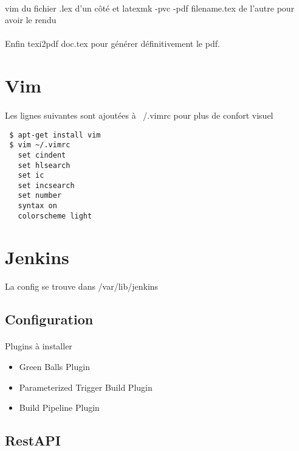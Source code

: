 \documentclass{article}
\begin{document}
\paragraph{}
vim du fichier .lex d'un côté et latexmk -pvc -pdf filename.tex de l'autre pour avoir le rendu
\paragraph{}
Enfin texi2pdf doc.tex pour générer définitivement le pdf.


\section{Vim}\label{vim}
\paragraph{}
Les lignes suivantes sont ajoutées à ~/.vimrc pour plus de confort visuel
\begin{verbatim}
 $ apt-get install vim
 $ vim ~/.vimrc
   set cindent
   set hlsearch
   set ic
   set incsearch
   set number
   syntax on
   colorscheme light
\end{verbatim}

\section{Jenkins}\label{jenkins}
\paragraph{}
La config se trouve dans /var/lib/jenkins

\subsection{Configuration}
\paragraph{}
Plugins à installer
\begin{itemize}
  \item Green Balls Plugin
  \item Parameterized Trigger Build Plugin 
  \item Build Pipeline Plugin
\end{itemize}

\subsection{RestAPI}
\end{document}
